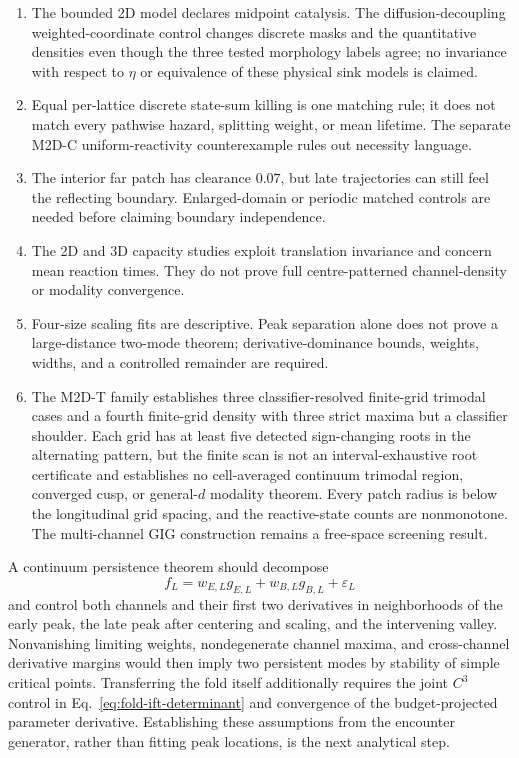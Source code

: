 \documentclass[aps,pre,reprint,amsmath,amssymb,longbibliography,floatfix]{revtex4-2}
\begin{document}
\begin{enumerate}
nondegenerate fold; the required target is joint \(C^3\) convergence in time
and control, including the parameter Duhamel derivatives.
\item The bounded 2D model declares midpoint catalysis. The
diffusion-decoupling weighted-coordinate control changes discrete masks and the
quantitative densities even though the three tested morphology labels agree;
no invariance with respect to \(\eta\) or equivalence
of these physical sink models is claimed.
\item Equal per-lattice discrete state-sum killing is one matching rule; it does not match every
pathwise hazard, splitting weight, or mean lifetime. The separate M2D-C
uniform-reactivity counterexample rules out necessity language.
\item The interior far patch has clearance \(0.07\), but late trajectories can
still feel the reflecting boundary. Enlarged-domain or periodic matched
controls are needed before claiming boundary independence.
\item The 2D and 3D capacity studies exploit translation invariance and concern
mean reaction times. They do not prove full centre-patterned channel-density
or modality convergence.
\item Four-size scaling fits are descriptive. Peak separation alone does not
prove a large-distance two-mode theorem; derivative-dominance bounds, weights,
widths, and a controlled remainder are required.
\item The M2D-T family establishes three classifier-resolved finite-grid
trimodal cases and a fourth finite-grid density with three strict maxima but a
classifier shoulder. Each grid has at least five detected sign-changing roots
in the alternating pattern, but the finite scan is not an
interval-exhaustive root certificate and establishes no cell-averaged
continuum trimodal region, converged cusp, or general-\(d\) modality theorem.
Every patch radius is below the longitudinal grid spacing,
and the reactive-state counts are nonmonotone. The multi-channel GIG
construction remains a free-space screening result.
\end{enumerate}

A continuum persistence theorem should decompose
\begin{equation}
f_L=w_{E,L}g_{E,L}+w_{B,L}g_{B,L}+\varepsilon_L
\label{eq:large-separation}
\end{equation}
and control both channels and their first two derivatives in neighborhoods of
the early peak, the late peak after centering and scaling, and the intervening
valley. Nonvanishing limiting weights, nondegenerate channel maxima, and
cross-channel derivative margins would then imply two persistent modes by
stability of simple critical points. Transferring the fold itself additionally
requires the joint \(C^3\) control in Eq.~\eqref{eq:fold-ift-determinant} and
convergence of the budget-projected parameter derivative. Establishing these
assumptions from the encounter generator, rather than fitting peak locations,
is the next analytical step.
\end{document}
